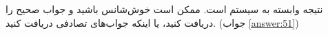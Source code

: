\section{}
\paragraph{}\label{hint:116}
نتیجه وابسته به سیستم است. ممکن است خوش‌شانس باشید و جواب صحیح را دریافت کنید، یا اینکه جواب‌های تصادفی دریافت کنید. (جواب \ref{answer:51})